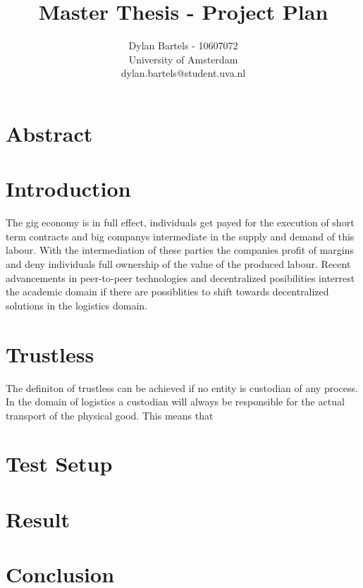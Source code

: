 \documentclass[11pt]{article}
\begin{document}
\title{Master Thesis - Project Plan}
\author{Dylan Bartels - 10607072\\University of Amsterdam \\dylan.bartels@student.uva.nl}
\maketitle

\section{Abstract}

\section{Introduction}

The gig economy is in full effect, individuals get payed for the execution of short term contracts and big companys intermediate in the supply and demand of this labour. With the intermediation of these parties the companies profit of margins and deny individuals full ownership of the value of the produced labour. Recent advancements in peer-to-peer technologies and decentralized posibilities interrest the academic domain if there are possiblities to shift towards decentralized solutions in the logistics domain\cite{research_demand}\cite{research_demand}\cite{research_demand}.\par

\section{Trustless}

The definiton of trustless can be achieved if no entity is custodian of any process. In the domain of logistics a custodian will always be responsible for the actual transport of the physical good. This means that

\section{Test Setup}

\section{Result}

\section{Conclusion}
\end{document}
